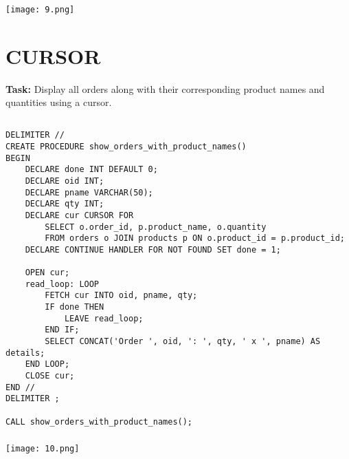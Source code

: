 \documentclass[12pt,a4paper]{article}
\begin{document}
\subsubsection{}
\begin{center}
    \texttt{[image: 9.png]}
\end{center}


\section{CURSOR}
\textbf{Task:} Display all orders along with their corresponding product names and quantities
using a cursor.

\subsection{}
\begin{lstlisting}
DELIMITER //
CREATE PROCEDURE show_orders_with_product_names()
BEGIN
    DECLARE done INT DEFAULT 0;
    DECLARE oid INT;
    DECLARE pname VARCHAR(50);
    DECLARE qty INT;
    DECLARE cur CURSOR FOR
        SELECT o.order_id, p.product_name, o.quantity
        FROM orders o JOIN products p ON o.product_id = p.product_id;
    DECLARE CONTINUE HANDLER FOR NOT FOUND SET done = 1;

    OPEN cur;
    read_loop: LOOP
        FETCH cur INTO oid, pname, qty;
        IF done THEN
            LEAVE read_loop;
        END IF;
        SELECT CONCAT('Order ', oid, ': ', qty, ' x ', pname) AS details;
    END LOOP;
    CLOSE cur;
END //
DELIMITER ;

CALL show_orders_with_product_names();

\end{lstlisting}

\subsubsection{}
\begin{center}
    \texttt{[image: 10.png]}
\end{center}
\end{document}
